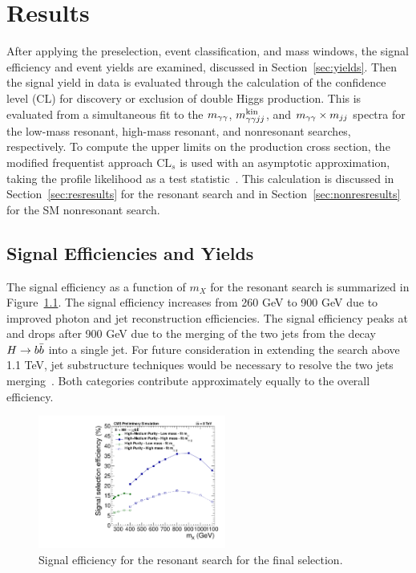 \chapter{Results\label{ch:results}}

After applying the preselection, event classification, and mass windows, the signal efficiency
and event yields are examined, discussed in Section~\ref{sec:yields}. Then the signal yield
in data is evaluated through the calculation of the confidence level (CL)
for discovery or exclusion of double Higgs production. This is evaluated from a simultaneous fit
to the $m_{\gamma\gamma}$, $m_{\gamma\gamma jj}^{\rm kin}$, and $m_{\gamma\gamma} \times m_{jj}$ spectra for the low-mass resonant, high-mass resonant,
and nonresonant searches, respectively.
To compute the upper limits on the production cross section, the modified frequentist approach
$\text{CL}_s$ is used with an asymptotic approximation, taking the profile likelihood as a test
statistic~\cite{CLS1,CLS2}. This calculation is discussed in Section~\ref{sec:resresults} for the
resonant search and in Section~\ref{sec:nonresresults} for the SM nonresonant search.

\section{Signal Efficiencies and Yields\label{sec:yields}}

The signal efficiency as a function of $m_X$ for the resonant search is summarized in
Figure~\ref{fig:eff_res}. The signal efficiency increases from 260 GeV to 900 GeV
due to improved photon and jet reconstruction efficiencies. The signal efficiency
peaks at and drops after 900 GeV due to the merging of the two jets from the decay $H\to b\bar{b}$ into
a single jet. For future consideration in extending the search above 1.1 TeV,
jet substructure techniques would be necessary to resolve the two jets merging~\cite{Ellis:2009su}.
Both categories contribute approximately equally to the overall efficiency.

\begin{figure}[ht!]
 \begin{center}
    \includegraphics[width=0.55\textwidth]{figures/results/eff_all.pdf}
      \end{center}
\caption{Signal efficiency for the resonant search for the final selection.}
\label{fig:eff_res}
\end{figure}

